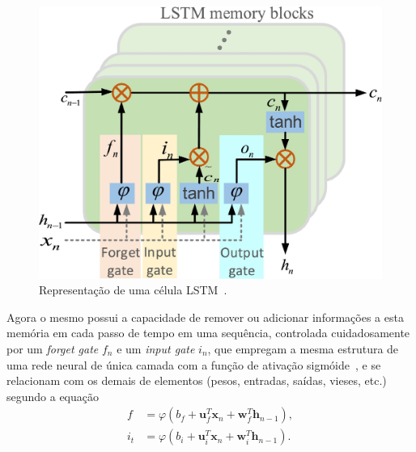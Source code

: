 \documentclass[a4paper]{ifacconf}
\begin{document}
\begin{figure}
	\centering
	\includegraphics[width=0.9\columnwidth]{images/lstm-crop.pdf}
	\caption{Representação de uma célula LSTM~\cite{Rasmus2019}.}
	\label{fig:lstm}
\end{figure}

Agora o mesmo possui a capacidade de remover ou adicionar informações a esta memória em cada passo de tempo em uma sequência, controlada cuidadosamente por um \textit{forget gate} $f_{n}$ e um \textit{input gate} $i_{n}$, que empregam a mesma estrutura de uma rede neural de única camada com a função de ativação sigmóide~\cite{Rasmus2019}, e se relacionam com os demais de elementos (pesos, entradas, saídas, vieses, etc.) segundo a equação %
\begin{subequations}
	\begin{align}
		f            &= \varphi(b_{f} + \textbf{u}_{f}^{T}\textbf{x}_{n}+\textbf{w}_{f}^{T}\textbf{h}_{n-1}), \label{eq.FG}\\
		i_{t}         &= \varphi(b_{i} + \textbf{u}_{i}^{T}\textbf{x}_{n}+\textbf{w}_{i}^{T}\textbf{h}_{n-1}). \label{eq.IG}
	\end{align}
\end{subequations} %
\end{document}
